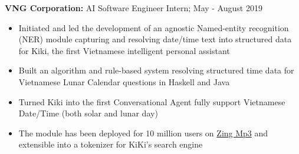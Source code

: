 \documentclass[a4paper,11pt]{article}
\begin{document}
\begin{flushleft}
	
	\textbf{VNG Corporation: } AI Software Engineer Intern; May - August 2019 \\
	\vspace{-\topsep}
	\begin{itemize}
		\setlength{\parskip}{2pt}
		\setlength{\itemsep}{0pt plus 1pt}
		\item Initiated and led the development of an agnostic Named-entity recognition (NER) module capturing and resolving date/time text into structured data for Kiki, the first Vietnamese intelligent personal assistant
		\item Built an algorithm and rule-based system resolving structured time data for Vietnamese Lunar Calendar questions in Haskell and Java  
		\item Turned Kiki into the first Conversational Agent fully support Vietnamese Date/Time (both solar and lunar day) 
		\item  The module has been deployed for 10 million users on \href{https://mp3.zing.vn/}{Zing Mp3} and extensible into a tokenizer for KiKi's search engine
	\end{itemize}
\vspace{-\topsep}
\centering{\noindent\makebox{\rule{8cm}{1.5pt}}}
\end{flushleft} 
\end{document}
